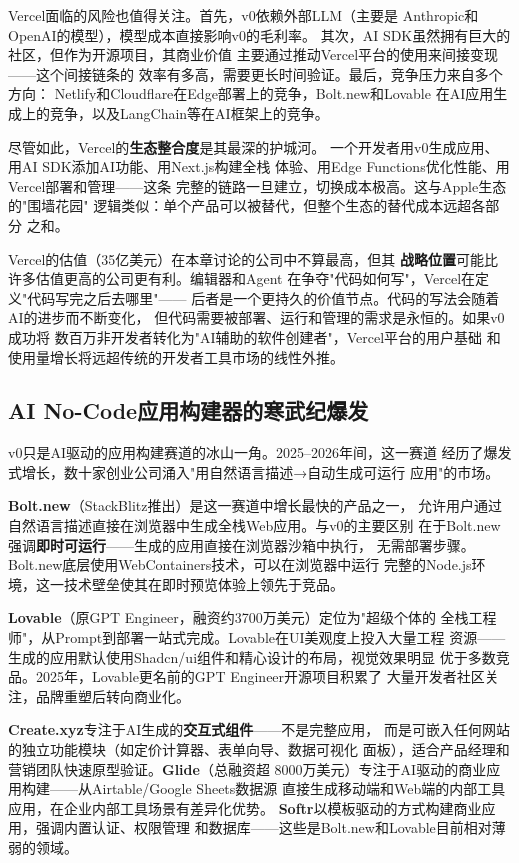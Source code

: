 Vercel面临的风险也值得关注。首先，v0依赖外部LLM（主要是
Anthropic和OpenAI的模型），模型成本直接影响v0的毛利率。
其次，AI SDK虽然拥有巨大的社区，但作为开源项目，其商业价值
主要通过推动Vercel平台的使用来间接变现——这个间接链条的
效率有多高，需要更长时间验证。最后，竞争压力来自多个方向：
Netlify和Cloudflare在Edge部署上的竞争，Bolt.new和Lovable
在AI应用生成上的竞争，以及LangChain等在AI框架上的竞争。

尽管如此，Vercel的\textbf{生态整合度}是其最深的护城河。
一个开发者用v0生成应用、用AI SDK添加AI功能、用Next.js构建全栈
体验、用Edge Functions优化性能、用Vercel部署和管理——这条
完整的链路一旦建立，切换成本极高。这与Apple生态的"围墙花园"
逻辑类似：单个产品可以被替代，但整个生态的替代成本远超各部分
之和。

Vercel的估值（35亿美元）在本章讨论的公司中不算最高，但其
\textbf{战略位置}可能比许多估值更高的公司更有利。编辑器和Agent
在争夺"代码如何写"，Vercel在定义"代码写完之后去哪里"——
后者是一个更持久的价值节点。代码的写法会随着AI的进步而不断变化，
但代码需要被部署、运行和管理的需求是永恒的。如果v0成功将
数百万非开发者转化为"AI辅助的软件创建者"，Vercel平台的用户基础
和使用量增长将远超传统的开发者工具市场的线性外推。

\subsection{AI No-Code应用构建器的寒武纪爆发}
\label{subsec:nocode-builders}

v0只是AI驱动的应用构建赛道的冰山一角。2025--2026年间，这一赛道
经历了爆发式增长，数十家创业公司涌入"用自然语言描述→自动生成可运行
应用"的市场。

\textbf{Bolt.new}（StackBlitz推出）是这一赛道中增长最快的产品之一，
允许用户通过自然语言描述直接在浏览器中生成全栈Web应用。与v0的主要区别
在于Bolt.new强调\textbf{即时可运行}——生成的应用直接在浏览器沙箱中执行，
无需部署步骤。Bolt.new底层使用WebContainers技术，可以在浏览器中运行
完整的Node.js环境，这一技术壁垒使其在即时预览体验上领先于竞品。

\textbf{Lovable}（原GPT Engineer，融资约3700万美元）定位为"超级个体的
全栈工程师"，从Prompt到部署一站式完成。Lovable在UI美观度上投入大量工程
资源——生成的应用默认使用Shadcn/ui组件和精心设计的布局，视觉效果明显
优于多数竞品。2025年，Lovable更名前的GPT Engineer开源项目积累了
大量开发者社区关注，品牌重塑后转向商业化。

\textbf{Create.xyz}专注于AI生成的\textbf{交互式组件}——不是完整应用，
而是可嵌入任何网站的独立功能模块（如定价计算器、表单向导、数据可视化
面板），适合产品经理和营销团队快速原型验证。\textbf{Glide}（总融资超
8000万美元）专注于AI驱动的商业应用构建——从Airtable/Google Sheets数据源
直接生成移动端和Web端的内部工具应用，在企业内部工具场景有差异化优势。
\textbf{Softr}以模板驱动的方式构建商业应用，强调内置认证、权限管理
和数据库——这些是Bolt.new和Lovable目前相对薄弱的领域。

